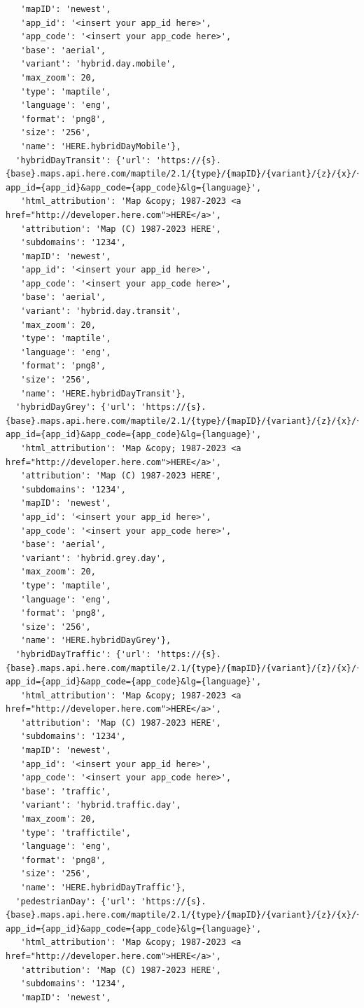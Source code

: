 \documentclass[
  letterpaper,
  DIV=11,
  numbers=noendperiod]{scrreprt}
\begin{document}
\begin{verbatim}
   'mapID': 'newest',
   'app_id': '<insert your app_id here>',
   'app_code': '<insert your app_code here>',
   'base': 'aerial',
   'variant': 'hybrid.day.mobile',
   'max_zoom': 20,
   'type': 'maptile',
   'language': 'eng',
   'format': 'png8',
   'size': '256',
   'name': 'HERE.hybridDayMobile'},
  'hybridDayTransit': {'url': 'https://{s}.{base}.maps.api.here.com/maptile/2.1/{type}/{mapID}/{variant}/{z}/{x}/{y}/{size}/{format}?app_id={app_id}&app_code={app_code}&lg={language}',
   'html_attribution': 'Map &copy; 1987-2023 <a href="http://developer.here.com">HERE</a>',
   'attribution': 'Map (C) 1987-2023 HERE',
   'subdomains': '1234',
   'mapID': 'newest',
   'app_id': '<insert your app_id here>',
   'app_code': '<insert your app_code here>',
   'base': 'aerial',
   'variant': 'hybrid.day.transit',
   'max_zoom': 20,
   'type': 'maptile',
   'language': 'eng',
   'format': 'png8',
   'size': '256',
   'name': 'HERE.hybridDayTransit'},
  'hybridDayGrey': {'url': 'https://{s}.{base}.maps.api.here.com/maptile/2.1/{type}/{mapID}/{variant}/{z}/{x}/{y}/{size}/{format}?app_id={app_id}&app_code={app_code}&lg={language}',
   'html_attribution': 'Map &copy; 1987-2023 <a href="http://developer.here.com">HERE</a>',
   'attribution': 'Map (C) 1987-2023 HERE',
   'subdomains': '1234',
   'mapID': 'newest',
   'app_id': '<insert your app_id here>',
   'app_code': '<insert your app_code here>',
   'base': 'aerial',
   'variant': 'hybrid.grey.day',
   'max_zoom': 20,
   'type': 'maptile',
   'language': 'eng',
   'format': 'png8',
   'size': '256',
   'name': 'HERE.hybridDayGrey'},
  'hybridDayTraffic': {'url': 'https://{s}.{base}.maps.api.here.com/maptile/2.1/{type}/{mapID}/{variant}/{z}/{x}/{y}/{size}/{format}?app_id={app_id}&app_code={app_code}&lg={language}',
   'html_attribution': 'Map &copy; 1987-2023 <a href="http://developer.here.com">HERE</a>',
   'attribution': 'Map (C) 1987-2023 HERE',
   'subdomains': '1234',
   'mapID': 'newest',
   'app_id': '<insert your app_id here>',
   'app_code': '<insert your app_code here>',
   'base': 'traffic',
   'variant': 'hybrid.traffic.day',
   'max_zoom': 20,
   'type': 'traffictile',
   'language': 'eng',
   'format': 'png8',
   'size': '256',
   'name': 'HERE.hybridDayTraffic'},
  'pedestrianDay': {'url': 'https://{s}.{base}.maps.api.here.com/maptile/2.1/{type}/{mapID}/{variant}/{z}/{x}/{y}/{size}/{format}?app_id={app_id}&app_code={app_code}&lg={language}',
   'html_attribution': 'Map &copy; 1987-2023 <a href="http://developer.here.com">HERE</a>',
   'attribution': 'Map (C) 1987-2023 HERE',
   'subdomains': '1234',
   'mapID': 'newest',

\end{verbatim}
\end{document}
